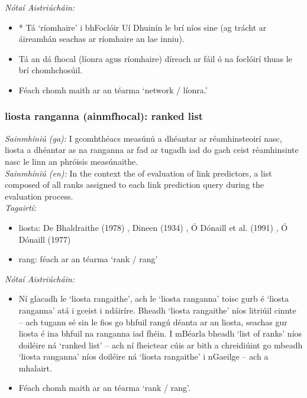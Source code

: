  \noindent \textit{Nótaí Aistriúcháin:}
\begin{itemize}
	\item * Tá `ríomhaire' i bhFoclóir Uí Dhuinín le brí níos sine (ag trácht ar áireamhán seachas ar ríomhaire an lae inniu).
	\item Tá an dá fhocal (líonra agus ríomhaire) díreach ar fáil ó na foclóirí thuas le brí chomhchosúil.
	\item Féach chomh maith ar an téarma `network / líonra.'
\end{itemize}


\subsubsection*{liosta ranganna (ainmfhocal): ranked list}
 \noindent \textit{Sainmhíniú (ga):} I gcomhthéacs measúnú a dhéantar ar réamhinsteoirí nasc, liosta a dhéantar as na ranganna ar fad ar tugadh iad do gach ceist réamhinsinte nasc le linn an phróisis measúnaithe.
\\
 \noindent \textit{Sainmhíniú (en):} In the context the of evaluation of link predictors, a list composed of all ranks assigned to each link prediction query during the evaluation process.
\\
 \noindent \textit{Tagairtí:}
\begin{itemize}
	\item liosta: De Bhaldraithe (1978) \cite{de-bhaldraithe}, Dineen (1934) \cite{dineen}, Ó Dónaill et al. (1991) \cite{focloir-beag}, Ó Dónaill (1977) \cite{odonaill}
	\item rang: féach ar an téarma `rank / rang'
\end{itemize}

 \noindent \textit{Nótaí Aistriúcháin:}
\begin{itemize}
	\item Ní glacadh le `liosta rangaithe', ach le `liosta ranganna' toisc gurb é `liosta ranganna' atá i gceist i ndáiríre. Bheadh `liosta rangaithe' níos litriúil cinnte -- ach tugann sé sin le fios go bhfuil rangú déanta ar an liosta, seachas gur liosta é ina bhfuil na ranganna iad fhéin. I mBéarla  bheadh `list of ranks' níos doiléire ná `ranked list' -- ach ní fheictear cúis ar bith a chreidiúint go mbeadh `liosta ranganna' níos doiléire ná `liosta rangaithe' i nGaeilge -- ach a mhalairt.
	\item Féach chomh maith ar an téarma `rank / rang'.
\end{itemize}



